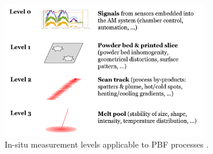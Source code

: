 \begin{figure}
    \centering
    \includegraphics[width=0.8\textwidth]{Images/Level Measurement.png}
    \caption[In-situ measurement levels.]{In-situ measurement levels applicable to PBF processes \cite{colosimo_-machine_2020}.}
    \label{fig:levels}
\end{figure}
